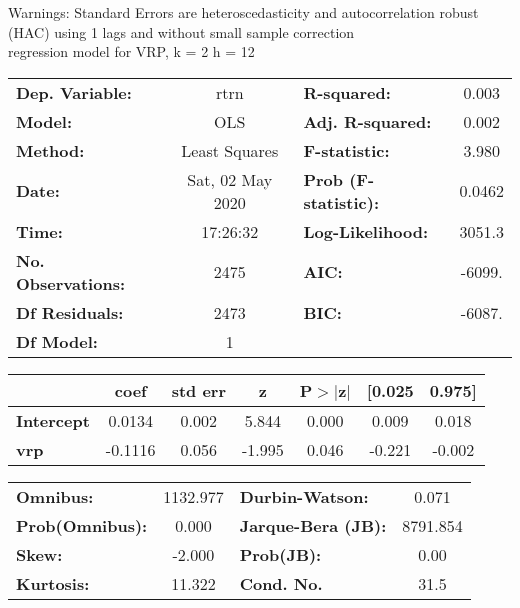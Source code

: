 Warnings: \newline
 [1] Standard Errors are heteroscedasticity and autocorrelation robust (HAC) using 1 lags and without small sample correction\\ 

regression model for VRP, k = 2 h = 12\begin{center}
\begin{tabular}{lclc}
\toprule
\textbf{Dep. Variable:}    &       rtrn       & \textbf{  R-squared:         } &     0.003   \\
\textbf{Model:}            &       OLS        & \textbf{  Adj. R-squared:    } &     0.002   \\
\textbf{Method:}           &  Least Squares   & \textbf{  F-statistic:       } &     3.980   \\
\textbf{Date:}             & Sat, 02 May 2020 & \textbf{  Prob (F-statistic):} &   0.0462    \\
\textbf{Time:}             &     17:26:32     & \textbf{  Log-Likelihood:    } &    3051.3   \\
\textbf{No. Observations:} &        2475      & \textbf{  AIC:               } &    -6099.   \\
\textbf{Df Residuals:}     &        2473      & \textbf{  BIC:               } &    -6087.   \\
\textbf{Df Model:}         &           1      & \textbf{                     } &             \\
\bottomrule
\end{tabular}
\begin{tabular}{lcccccc}
                   & \textbf{coef} & \textbf{std err} & \textbf{z} & \textbf{P$> |$z$|$} & \textbf{[0.025} & \textbf{0.975]}  \\
\midrule
\textbf{Intercept} &       0.0134  &        0.002     &     5.844  &         0.000        &        0.009    &        0.018     \\
\textbf{vrp}       &      -0.1116  &        0.056     &    -1.995  &         0.046        &       -0.221    &       -0.002     \\
\bottomrule
\end{tabular}
\begin{tabular}{lclc}
\textbf{Omnibus:}       & 1132.977 & \textbf{  Durbin-Watson:     } &    0.071  \\
\textbf{Prob(Omnibus):} &   0.000  & \textbf{  Jarque-Bera (JB):  } & 8791.854  \\
\textbf{Skew:}          &  -2.000  & \textbf{  Prob(JB):          } &     0.00  \\
\textbf{Kurtosis:}      &  11.322  & \textbf{  Cond. No.          } &     31.5  \\
\bottomrule
\end{tabular}
\end{center}

